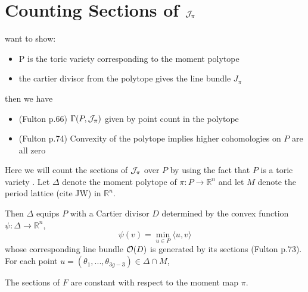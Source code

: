 \section{Counting Sections of $\mathcal{J}_\pi$}

	want to show:
	\begin{itemize}
		\item P is the toric variety corresponding to the moment polytope 
		\item the cartier divisor from the polytope gives the line bundle $J_\pi$
	\end{itemize}
	then we have
	\begin{itemize}
		\item (Fulton p.66) $\Gamma(P,\mathcal{J}_\pi)$ given by point count in the polytope
		\item (Fulton p.74) Convexity of the polytope implies higher cohomologies on $P$ are all zero
	\end{itemize}

	Here we will count the sections of $\mathcal{J}_\pi$ over $P$ by using the fact that $P$ is a toric variety \cite[Thm 3.13]{hurtubise_representations_2000}. Let $\Delta$ denote the moment polytope of $\pi:P\to\mathbb{R}^n$ and let $M$ denote the period lattice (cite JW) in $\mathbb{R}^n$. 
	
	Then $\Delta$ equips $P$ with a Cartier divisor $D$ determined by the convex function $\psi:\Delta \to \mathbb{R}^n$,
	\begin{equation}
		\psi(v) = \min_{u\in P}\langle u,v\rangle
	\end{equation}
	whose corresponding line bundle $\mathcal{O}(D)$ is generated by its sections (Fulton p.73). For each point $u = (\theta_1,...,\theta_{3g-3})\in \Delta \cap M$, 
	\begin{lemma}
		The sections of $F$ are constant with respect to the moment map $\pi$.
	\end{lemma} 
	
	
	
		
	